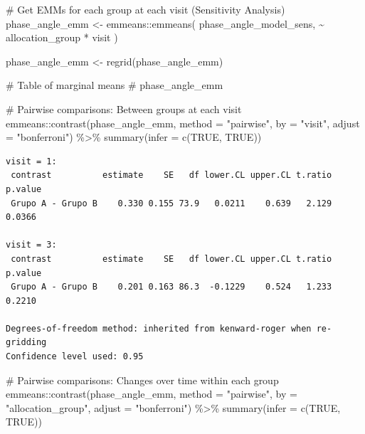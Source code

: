 \documentclass[
  12pt,
]{article}
\newenvironment{Shaded}{\begin{snugshade}}{\end{snugshade}}
\newcommand{\AttributeTok}[1]{\textcolor[rgb]{0.40,0.45,0.13}{#1}}
\newcommand{\CommentTok}[1]{\textcolor[rgb]{0.37,0.37,0.37}{#1}}
\newcommand{\ConstantTok}[1]{\textcolor[rgb]{0.56,0.35,0.01}{#1}}
\newcommand{\FunctionTok}[1]{\textcolor[rgb]{0.28,0.35,0.67}{#1}}
\newcommand{\NormalTok}[1]{\textcolor[rgb]{0.00,0.23,0.31}{#1}}
\newcommand{\OtherTok}[1]{\textcolor[rgb]{0.00,0.23,0.31}{#1}}
\newcommand{\SpecialCharTok}[1]{\textcolor[rgb]{0.37,0.37,0.37}{#1}}
\newcommand{\StringTok}[1]{\textcolor[rgb]{0.13,0.47,0.30}{#1}}
\begin{document}
\begin{Shaded}
\begin{Highlighting}[]
\CommentTok{\# Get EMMs for each group at each visit (Sensitivity Analysis)}
\NormalTok{phase\_angle\_emm }\OtherTok{\textless{}{-}}\NormalTok{ emmeans}\SpecialCharTok{::}\FunctionTok{emmeans}\NormalTok{(}
\NormalTok{    phase\_angle\_model\_sens, }
    \SpecialCharTok{\textasciitilde{}}\NormalTok{ allocation\_group }\SpecialCharTok{*}\NormalTok{ visit}
\NormalTok{)}

\NormalTok{phase\_angle\_emm }\OtherTok{\textless{}{-}} \FunctionTok{regrid}\NormalTok{(phase\_angle\_emm)}

\CommentTok{\# Table of marginal means}
\CommentTok{\# phase\_angle\_emm}

\CommentTok{\# Pairwise comparisons: Between groups at each visit}
\NormalTok{emmeans}\SpecialCharTok{::}\FunctionTok{contrast}\NormalTok{(phase\_angle\_emm,}
\AttributeTok{method =} \StringTok{"pairwise"}\NormalTok{, }\AttributeTok{by =} \StringTok{"visit"}\NormalTok{,}
\AttributeTok{adjust =} \StringTok{"bonferroni"}\NormalTok{) }\SpecialCharTok{\%\textgreater{}\%} \FunctionTok{summary}\NormalTok{(}\AttributeTok{infer =} \FunctionTok{c}\NormalTok{(}\ConstantTok{TRUE}\NormalTok{, }\ConstantTok{TRUE}\NormalTok{))}
\end{Highlighting}
\end{Shaded}

\begin{verbatim}
visit = 1:
 contrast          estimate    SE   df lower.CL upper.CL t.ratio p.value
 Grupo A - Grupo B    0.330 0.155 73.9   0.0211    0.639   2.129  0.0366

visit = 3:
 contrast          estimate    SE   df lower.CL upper.CL t.ratio p.value
 Grupo A - Grupo B    0.201 0.163 86.3  -0.1229    0.524   1.233  0.2210

Degrees-of-freedom method: inherited from kenward-roger when re-gridding 
Confidence level used: 0.95 
\end{verbatim}

\begin{Shaded}
\begin{Highlighting}[]
\CommentTok{\# Pairwise comparisons: Changes over time within each group}
\NormalTok{emmeans}\SpecialCharTok{::}\FunctionTok{contrast}\NormalTok{(phase\_angle\_emm,}
\AttributeTok{method =} \StringTok{"pairwise"}\NormalTok{, }\AttributeTok{by =} \StringTok{"allocation\_group"}\NormalTok{,}
\AttributeTok{adjust =} \StringTok{"bonferroni"}\NormalTok{) }\SpecialCharTok{\%\textgreater{}\%} \FunctionTok{summary}\NormalTok{(}\AttributeTok{infer =} \FunctionTok{c}\NormalTok{(}\ConstantTok{TRUE}\NormalTok{, }\ConstantTok{TRUE}\NormalTok{))}
\end{Highlighting}
\end{Shaded}
\end{document}
